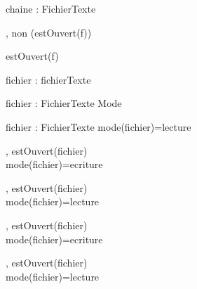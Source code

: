 \begin{algorithme}
		{chaine : \chaine}%
		{FichierTexte}
	
		{%
			, %
		}%
		{non (estOuvert(f))}
		
		{%
		}%
		{estOuvert(f)}
		
		{fichier : fichierTexte}
		{\booleen}
		{}
		
		{fichier : FichierTexte}%
		{Mode}%
		{}
		
		{fichier : FichierTexte}%
		{\booleen}%
		{mode(fichier)=lecture}
		
		{%
			, %
			\paramEntree{\chaine}%
		}%
		{%
			estOuvert(fichier)\\%
			mode(fichier)=ecriture%
		}
		
		{%
			, %
			\paramSortie{\chaine}%
		}%
		{%
			estOuvert(fichier)\\%
			mode(fichier)=lecture%
		}
		
		{%
			, %
			\paramEntree{\caractere}%
		}%
		{%
			estOuvert(fichier)\\%
			mode(fichier)=ecriture%
		}
		
		{%
			, %
			\paramSortie{\caractere}%
		}%
		{%
			estOuvert(fichier)\\%
			mode(fichier)=lecture%
		}
		
	
\end{algorithme}
